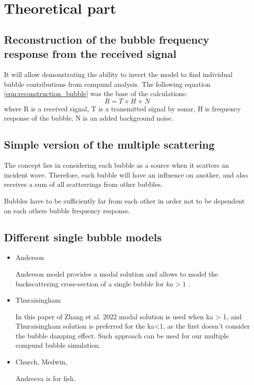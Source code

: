 \documentclass[11pt]{article}
\begin{document}
\section{Theoretical part}

\subsection*{Reconstruction of the bubble frequency response from the received signal}

It will allow demonstrating the ability to invert the model to find individual bubble contributions from compund analysis.
The following equation \ref*{eqn:reconstruction_bubble} was the base of the calculations:
\begin{equation}
    \label{eqn:reconstruction_bubble}
    R = T \times H + N
\end{equation}
where R is a received signal, T is a transmitted signal by sonar, H is frequency response of the bubble, N is an added background noise.


\subsection*{Simple version of the multiple scattering }

The concept lies in considering each bubble as a source when it scatters an incident wave. 
Therefore, each bubble will have an influence on another, and also receives a sum of all scatterrings from 
other bubbles. 

Bubbles have to be sufficiently far from each other in order not to be dependent on each others bubble frequency response.

\subsection*{Different single bubble models}
\begin{itemize}
    \item Anderson

    Anderson model provides a modal solution and allows to model the backscattering cross-section of a single bubble for $ka > 1$ \cite{anderson_sound_2005}.

    \item Thuraisingham

    In this paper of Zhang et al. 2022 \cite{zhang_efficient_2022} modal solution is used when ka > 1, and Thuraisingham solution is preferred for the ka<1, as the first doesn't consider the bubble damping effect.  Such approach can be used for our multiple compund bubble simulation.

    \item Church, Medwin,

    Andreeva is for fish.


\end{itemize}
\end{document}
